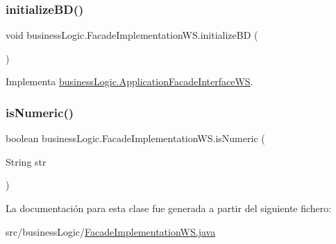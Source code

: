 \subsubsection{\texorpdfstring{initializeBD()}{initializeBD()}}
{\footnotesize\ttfamily void business\+Logic.\+Facade\+Implementation\+W\+S.\+initialize\+BD (\begin{DoxyParamCaption}{ }\end{DoxyParamCaption})}



Implementa \mbox{\hyperlink{interfacebusiness_logic_1_1_application_facade_interface_w_s_a59eacfa5890466c6a338d0df2e487965}{business\+Logic.\+Application\+Facade\+Interface\+WS}}.

\mbox{\label{classbusiness_logic_1_1_facade_implementation_w_s_abde3726431e6d9708422689a30c9bbd6}} 
\subsubsection{\texorpdfstring{isNumeric()}{isNumeric()}}
{\footnotesize\ttfamily boolean business\+Logic.\+Facade\+Implementation\+W\+S.\+is\+Numeric (\begin{DoxyParamCaption}\item[{String}]{str }\end{DoxyParamCaption})}



La documentación para esta clase fue generada a partir del siguiente fichero\+:\begin{DoxyCompactItemize}
\item 
src/business\+Logic/\mbox{\hyperlink{_facade_implementation_w_s_8java}{Facade\+Implementation\+W\+S.\+java}}\end{DoxyCompactItemize}
